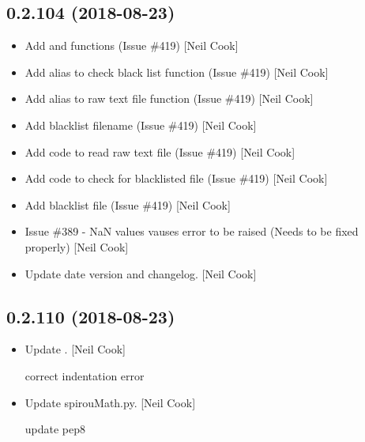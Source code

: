 \documentclass[a4paper,10pt,english]{report}
\begin{document}
\subsection{0.2.104 (2018-08-23)}
\label{\detokenize{misc/changelog:id355}}\begin{itemize}
\item {} 
Add  and  functions (Issue \#419) {[}Neil
Cook{]}

\item {} 
Add alias to check black list function (Issue \#419) {[}Neil Cook{]}

\item {} 
Add alias to raw text file function (Issue \#419) {[}Neil Cook{]}

\item {} 
Add blacklist filename (Issue \#419) {[}Neil Cook{]}

\item {} 
Add code to read raw text file (Issue \#419) {[}Neil Cook{]}

\item {} 
Add code to check for blacklisted file (Issue \#419) {[}Neil Cook{]}

\item {} 
Add blacklist file (Issue \#419) {[}Neil Cook{]}

\item {} 
Issue \#389 - NaN values vauses error to be raised (Needs to be fixed
properly) {[}Neil Cook{]}

\item {} 
Update date version and changelog. {[}Neil Cook{]}

\end{itemize}


\subsection{0.2.110 (2018-08-23)}
\label{\detokenize{misc/changelog:id356}}\begin{itemize}
\item {} 
Update . {[}Neil Cook{]}

correct indentation error

\item {} 
Update spirouMath.py. {[}Neil Cook{]}

update pep8

\end{itemize}
\end{document}
